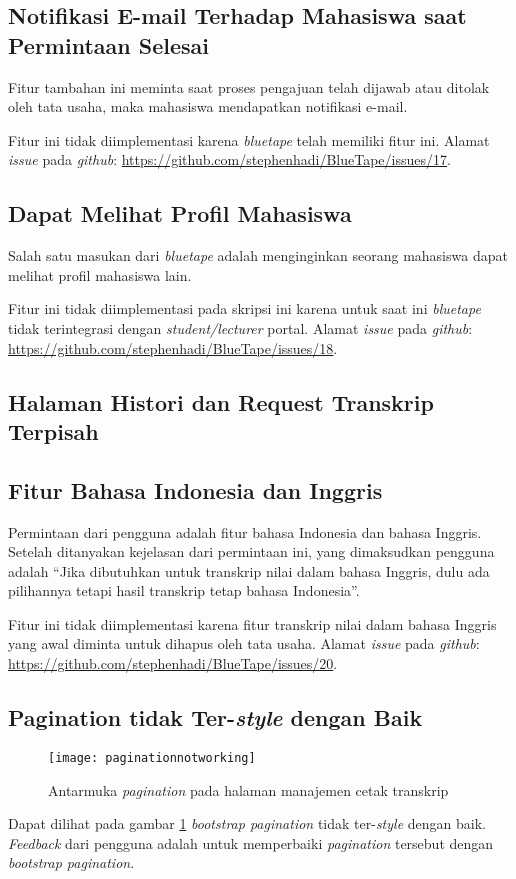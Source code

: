 \subsection{Notifikasi E-mail Terhadap Mahasiswa saat Permintaan Selesai}
\label{issue:17}
Fitur tambahan ini meminta saat proses pengajuan telah dijawab atau ditolak oleh tata usaha, maka mahasiswa mendapatkan notifikasi e-mail.

Fitur ini tidak diimplementasi karena \textit{bluetape} telah memiliki fitur ini. Alamat \textit{issue} pada \textit{github}: \url{https://github.com/stephenhadi/BlueTape/issues/17}.
 

\subsection{Dapat Melihat Profil Mahasiswa}

\label{issue:18}
Salah satu masukan dari \textit{bluetape} adalah menginginkan seorang mahasiswa dapat melihat profil mahasiswa lain.

Fitur ini tidak diimplementasi pada skripsi ini karena untuk saat ini \textit{bluetape} tidak terintegrasi dengan \textit{student/lecturer} portal. Alamat \textit{issue} pada \textit{github}: \url{https://github.com/stephenhadi/BlueTape/issues/18}. 

\subsection{Halaman Histori dan Request Transkrip Terpisah}
\label{issue:19}
\subsection{Fitur Bahasa Indonesia dan Inggris}
\label{issue:20}
Permintaan dari pengguna adalah fitur bahasa Indonesia dan bahasa Inggris. Setelah ditanyakan kejelasan dari permintaan ini, yang dimaksudkan pengguna adalah ``Jika dibutuhkan untuk transkrip nilai dalam bahasa Inggris, dulu ada pilihannya tetapi hasil transkrip tetap bahasa Indonesia''.

Fitur ini tidak diimplementasi karena fitur transkrip nilai dalam bahasa Inggris yang awal diminta untuk dihapus oleh tata usaha. Alamat \textit{issue} pada \textit{github}: \url{https://github.com/stephenhadi/BlueTape/issues/20}. 
\subsection{Pagination tidak Ter-\textit{style} dengan Baik}
\label{issue:22}
\begin{figure}[H]
	\centering
	\texttt{[image: paginationnotworking]} 
	\caption{Antarmuka \textit{pagination} pada halaman manajemen cetak transkrip}
	\label{fig:paginationmanajemencetaktranskrip}
\end{figure}
Dapat dilihat pada gambar \ref{fig:paginationmanajemencetaktranskrip} \textit{bootstrap pagination} tidak ter-\textit{style} dengan baik. \textit{Feedback} dari pengguna adalah untuk memperbaiki \textit{pagination} tersebut dengan \textit{bootstrap pagination}.

